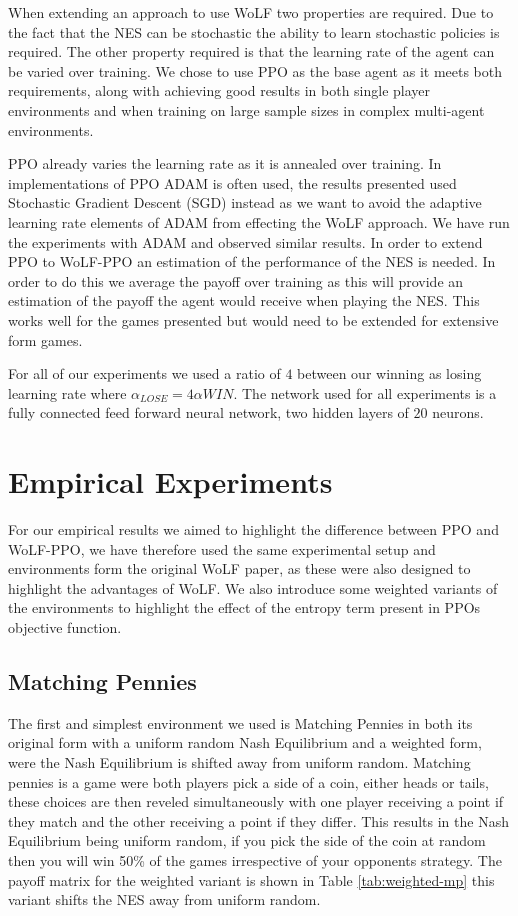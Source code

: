 \documentclass[conference]{IEEEtran}
\begin{document}
When extending an approach to use WoLF two properties are required. Due to the fact that the NES can be stochastic the ability to learn stochastic policies is required. The other property required is that the learning rate of the agent can be varied over training. We chose to use PPO as the base agent as it meets both requirements, along with achieving good results in both single player environments and when training on large sample sizes in complex multi-agent environments\cite{OpenAI_dota}. 

PPO already varies the learning rate as it is annealed over training. In implementations of PPO ADAM is often used, the results presented used Stochastic Gradient Descent (SGD) instead as we want to avoid the adaptive learning rate elements of ADAM from effecting the WoLF approach. We have run the experiments with ADAM and observed similar results. In order to extend PPO to WoLF-PPO an estimation of the performance of the NES is needed. In order to do this we average the payoff over training as this will provide an estimation of the payoff the agent would receive when playing the NES. This works well for the games presented but would need to be extended for extensive form games.

For all of our experiments we used a ratio of $4$ between our winning as losing learning rate where $\alpha_{LOSE} = 4\alpha{WIN}$. The network used for all experiments is a fully connected feed forward neural network, two hidden layers of $20$ neurons.

\section{Empirical Experiments}

For our empirical results we aimed to highlight the difference between PPO and WoLF-PPO, we have therefore used the same experimental setup and environments form the original WoLF paper, as these were also designed to highlight the advantages of WoLF. We also introduce some weighted variants of the environments to highlight the effect of the entropy term present in PPOs objective function.

\subsection{Matching Pennies}

The first and simplest environment we used is Matching Pennies in both its original form with a uniform random Nash Equilibrium and a weighted form, were the Nash Equilibrium is shifted away from uniform random. Matching pennies is a game were both players pick a side of a coin, either heads or tails, these choices are then reveled simultaneously with one player receiving a point if they match and the other receiving a point if they differ. This results in the Nash Equilibrium being uniform random, if you pick the side of the coin at random then you will win 50\% of the games irrespective of your opponents strategy. The payoff matrix for the weighted variant is shown in Table \ref{tab:weighted-mp} this variant shifts the NES away from uniform random.
\end{document}
